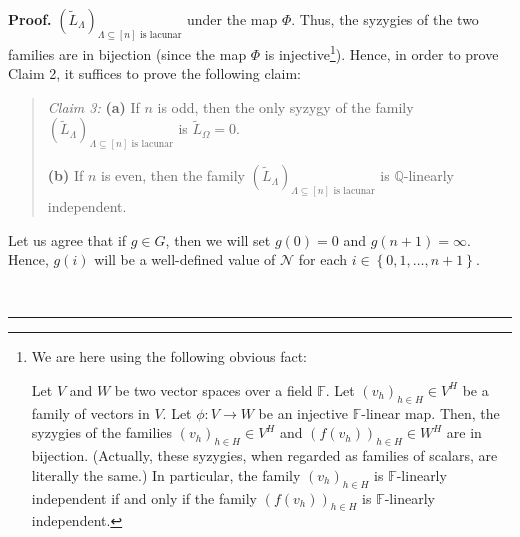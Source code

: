 \documentclass[numbers=enddot,12pt,final,onecolumn,notitlepage]{scrartcl}%
\theoremstyle{definition}
\newenvironment{statement}{\begin{quote}}{\end{quote}}
\newenvironment{proof}[1][Proof]{\noindent\textbf{#1.} }{\ \rule{0.5em}{0.5em}}
\begin{document}
\begin{proof}
$\left(  \widetilde{L}_{\Lambda}\right)  _{\Lambda\subseteq\left[  n\right]
\text{ is lacunar}}$ under the map $\Phi$. Thus, the syzygies of the two
families are in bijection (since the map $\Phi$ is injective\footnote{We are
here using the following obvious fact:
\par
Let $V$ and $W$ be two vector spaces over a field $\mathbb{F}$. Let $\left(
v_{h}\right)  _{h\in H}\in V^{H}$ be a family of vectors in $V$. Let
$\phi:V\rightarrow W$ be an injective $\mathbb{F}$-linear map. Then, the
syzygies of the families $\left(  v_{h}\right)  _{h\in H}\in V^{H}$ and
$\left(  f\left(  v_{h}\right)  \right)  _{h\in H}\in W^{H}$ are in bijection.
(Actually, these syzygies, when regarded as families of scalars, are literally
the same.) In particular, the family $\left(  v_{h}\right)  _{h\in H}$ is
$\mathbb{F}$-linearly independent if and only if the family $\left(  f\left(
v_{h}\right)  \right)  _{h\in H}$ is $\mathbb{F}$-linearly independent.}).
Hence, in order to prove Claim 2, it suffices to prove the following claim:

\begin{statement}
\textit{Claim 3:} \textbf{(a)} If $n$ is odd, then the only syzygy of the
family $\left(  \widetilde{L}_{\Lambda}\right)  _{\Lambda\subseteq\left[
n\right]  \text{ is lacunar}}$ is $\widetilde{L}_{\Omega}=0$.

\textbf{(b)} If $n$ is even, then the family $\left(  \widetilde{L}_{\Lambda
}\right)  _{\Lambda\subseteq\left[  n\right]  \text{ is lacunar}}$ is
$\mathbb{Q}$-linearly independent.
\end{statement}

Let us agree that if $g\in G$, then we will set $g\left(  0\right)  =0$ and
$g\left(  n+1\right)  =\infty$. Hence, $g\left(  i\right)  $ will be a
well-defined value of $\mathcal{N}$ for each $i\in\left\{  0,1,\ldots
,n+1\right\}  $.


\end{proof}
\end{document}
